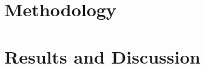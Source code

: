 \documentclass[conference]{IEEEtran}
\begin{document}
\section{Methodology}
\label{sec:methodology}


\clearpage
\section{Results and Discussion}
\label{sec:results}

\end{document}
